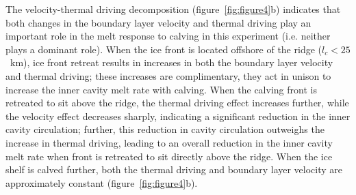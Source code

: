 \documentclass[draft]{agujournal2019}
\begin{document}
The velocity-thermal driving decomposition (figure~\ref{fig:figure4}b) indicates that both changes in the boundary layer velocity and thermal driving play an important role in the melt response to calving in this experiment (i.e. neither plays a dominant role).  When the ice front is located offshore of the ridge ($l_c < 25$~km), ice front retreat results in increases in both the boundary layer velocity and thermal driving; these increases are complimentary, they act in unison to increase the inner cavity melt rate with calving. When the calving front is retreated to sit above the ridge, the thermal driving effect increases further, while the velocity effect decreases sharply, indicating a significant reduction in the inner cavity circulation; further, this reduction in cavity circulation outweighs the increase in thermal driving, leading to an overall reduction in the inner cavity melt rate when front is retreated to sit directly above the ridge. When the ice shelf is calved further, both the thermal driving and boundary layer velocity are approximately constant (figure~\ref{fig:figure4}b).
\end{document}
